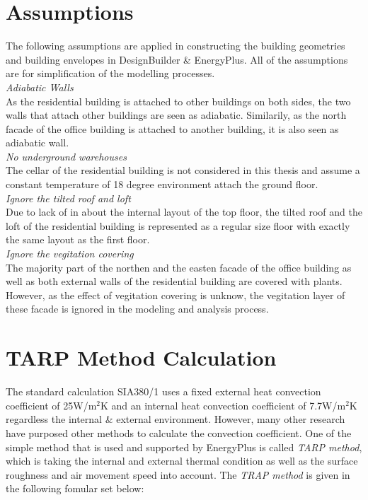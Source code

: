 \documentclass[a4paper, oneside]{discothesis}
\begin{document}
\appendix

\chapter{Assumptions}\label{sec:assumptions}

	The following assumptions are applied in constructing the building geometries and building envelopes in DesignBuilder \& EnergyPlus. All of the assumptions are for simplification of the modelling processes.\\ 

	\textit{Adiabatic Walls}\\
	As the residential building is attached to other buildings on both sides, the two walls that attach other buildings are seen as adiabatic. Similarily, as the north facade of the office building is attached to another building, it is also seen as adiabatic wall.\\

	\textit{No underground warehouses}\\
	The cellar of the residential building is not considered in this thesis and assume a constant temperature of 18 degree environment attach the ground floor.\\

	\textit{Ignore the tilted roof and loft}\\
	Due to lack of in about the internal layout of the top floor, the tilted roof and the loft of the residential building is represented as a regular size floor with exactly the same layout as the first floor.\\

	\textit{Ignore the vegitation covering}\\
	The majority part of the northen and the easten facade of the office building as well as both external walls of the residential building are covered with plants. However, as the effect of vegitation covering is unknow, the vegitation layer of these facade is ignored in the modeling and analysis process.\\


\chapter{TARP Method Calculation}\label{sec:tarp}
	The standard calculation SIA380/1 uses a fixed external heat convection coefficient of 25W/m$^2$K and an internal heat convection coefficient of 7.7W/m$^2$K regardless the internal \& external environment. However, many other research have purposed other methods to calculate the convection coefficient. One of the simple method that is used and supported by EnergyPlus is called \textit{TARP method}, which is taking the internal and external thermal condition as well as the surface roughness and air movement speed into account. The \textit{TRAP method} is given in the following fomular set below: \\
\end{document}

